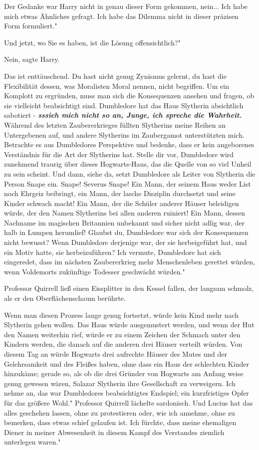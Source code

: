 Der Gedanke war Harry nicht in genau dieser Form gekommen, nein... \glqq Ich
habe mich etwas Ähnliches gefragt. Ich habe das Dilemma nicht in dieser präzisen
Form formuliert."

\glqq Und jetzt, wo Sie es haben, ist die Lösung offensichtlich?"

\glqq Nein\grqq{}, sagte Harry.

\glqq Das ist enttäuschend. Du hast nicht genug Zynismus gelernt, du hast die
Flexibilität dessen, was Moralisten Moral nennen, nicht begriffen. Um ein
Komplott zu ergründen, muss man sich die Konsequenzen ansehen und fragen, ob sie
vielleicht beabsichtigt sind. Dumbledore hat das Haus Slytherin absichtlich
sabotiert - \textbf{\emph{sssieh mich nicht so an, Junge, ich spreche die
Wahrheit.}} Während des letzten Zaubererkrieges füllten Slytherins meine Reihen
an Untergebenen auf, und andere Slytherins im Zaubergamot unterstützten mich.
Betrachte es aus Dumbledores Perspektive und bedenke, dass er kein angeborenes
Verständnis für die Art der Slytherins hat. Stelle dir vor, Dumbledore wird
zunehmend traurig über dieses Hogwarts-Haus, das die Quelle von so viel Unheil
zu sein scheint. Und dann, siehe da, setzt Dumbledore als Leiter von Slytherin
die Person Snape ein. Snape! Severus Snape! Ein Mann, der seinem Haus weder List
noch Ehrgeiz beibringt, ein Mann, der lasche Disziplin durchsetzt und seine
Kinder schwach macht! Ein Mann, der die Schüler anderer Häuser beleidigen würde,
der den Namen Slytherins bei allen anderen ruiniert! Ein Mann, dessen Nachname
im magischen Britannien unbekannt und sicher nicht adlig war, der halb in Lumpen
herumlief! Glaubst du, Dumbledore war sich der Konsequenzen nicht bewusst? Wenn
Dumbledore derjenige war, der sie herbeigeführt hat, und ein Motiv hatte, sie
herbeizuführen? Ich vermute, Dumbledore hat sich eingeredet, dass im nächsten
Zaubererkrieg mehr Menschenleben gerettet würden, wenn Voldemorts zukünftige
Todesser geschwächt würden."

Professor Quirrell ließ einen Eissplitter in den Kessel fallen, der langsam
schmolz, als er den Oberflächenschaum berührte.

\glqq Wenn man diesen Prozess lange genug fortsetzt, würde kein Kind mehr nach
Slytherin gehen wollen. Das Haus würde ausgemustert werden, und wenn der Hut den
Namen weiterhin rief, würde er zu einem Zeichen der Schmach unter den Kindern
werden, die danach auf die anderen drei Häuser verteilt würden. Von diesem Tag
an würde Hogwarts drei aufrechte Häuser des Mutes und der Gelehrsamkeit und des
Fleißes haben, ohne dass ein Haus der schlechten Kinder hinzukäme; gerade so,
als ob die drei Gründer von Hogwarts am Anfang weise genug gewesen wären,
Salazar Slytherin ihre Gesellschaft zu verweigern. Ich nehme an, das war
Dumbledores beabsichtigtes Endspiel; ein kurzfristiges Opfer für das größere
Wohl." Professor Quirrell lächelte sardonisch. \glqq Und Lucius hat das alles
geschehen lassen, ohne zu protestieren oder, wie ich annehme, ohne zu bemerken,
dass etwas schief gelaufen ist. Ich fürchte, dass meine ehemaligen Diener in
meiner Abwesenheit in diesem Kampf des Verstandes ziemlich unterlegen waren."

